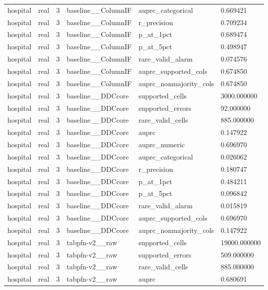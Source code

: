 \begin{tabular}{llllll}
hospital & real & 3 & baseline\_\_ColumnIF & auprc\_categorical & 0.669421 \\
hospital & real & 3 & baseline\_\_ColumnIF & r\_precision & 0.709234 \\
hospital & real & 3 & baseline\_\_ColumnIF & p\_at\_1pct & 0.689474 \\
hospital & real & 3 & baseline\_\_ColumnIF & p\_at\_5pct & 0.498947 \\
hospital & real & 3 & baseline\_\_ColumnIF & rare\_valid\_alarm & 0.074576 \\
hospital & real & 3 & baseline\_\_ColumnIF & auprc\_supported\_cols & 0.674850 \\
hospital & real & 3 & baseline\_\_ColumnIF & auprc\_nonmajority\_cols & 0.674850 \\
hospital & real & 3 & baseline\_\_DDCcore & supported\_cells & 3000.000000 \\
hospital & real & 3 & baseline\_\_DDCcore & supported\_errors & 92.000000 \\
hospital & real & 3 & baseline\_\_DDCcore & rare\_valid\_cells & 885.000000 \\
hospital & real & 3 & baseline\_\_DDCcore & auprc & 0.147922 \\
hospital & real & 3 & baseline\_\_DDCcore & auprc\_numeric & 0.696970 \\
hospital & real & 3 & baseline\_\_DDCcore & auprc\_categorical & 0.026062 \\
hospital & real & 3 & baseline\_\_DDCcore & r\_precision & 0.180747 \\
hospital & real & 3 & baseline\_\_DDCcore & p\_at\_1pct & 0.484211 \\
hospital & real & 3 & baseline\_\_DDCcore & p\_at\_5pct & 0.096842 \\
hospital & real & 3 & baseline\_\_DDCcore & rare\_valid\_alarm & 0.015819 \\
hospital & real & 3 & baseline\_\_DDCcore & auprc\_supported\_cols & 0.696970 \\
hospital & real & 3 & baseline\_\_DDCcore & auprc\_nonmajority\_cols & 0.147922 \\
hospital & real & 3 & tabpfn-v2\_\_raw & supported\_cells & 19000.000000 \\
hospital & real & 3 & tabpfn-v2\_\_raw & supported\_errors & 509.000000 \\
hospital & real & 3 & tabpfn-v2\_\_raw & rare\_valid\_cells & 885.000000 \\
hospital & real & 3 & tabpfn-v2\_\_raw & auprc & 0.680691 \\

\end{tabular}
